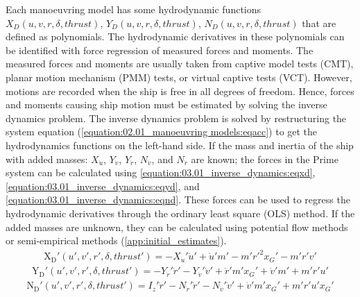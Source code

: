 Each manoeuvring model has some hydrodynamic functions \(X_D(u,v,r,\delta,thrust)\), \(Y_D(u,v,r,\delta,thrust)\), \(N_D(u,v,r,\delta,thrust)\) that are defined as polynomials. The hydrodynamic derivatives in these polynomials can be identified with force regression of measured forces and moments. The measured forces and moments are usually taken from captive model tests (CMT), planar motion mechanism (PMM) tests, or virtual captive tests (VCT). However, motions are recorded when the ship is free in all degrees of freedom. Hence, forces and moments causing ship motion must be estimated by solving the inverse dynamics problem.
The inverse dynamics problem is solved by restructuring the system equation (\autoref{equation:02.01_manoeuvring models:eqacc}) to get the hydrodynamics functions on the left-hand side. If the mass and inertia of the ship with added masses: \(X_{\dot{u}}\), \(Y_{\dot{v}}\), \(Y_{\dot{r}}\), \(N_{\dot{v}}\), and \(N_{\dot{r}}\) are known; the forces in the Prime system can be calculated using \autoref{equation:03.01_inverse_dynamics:eqxd}, \autoref{equation:03.01_inverse_dynamics:eqyd}, and \autoref{equation:03.01_inverse_dynamics:eqnd}.
These forces can be used to regress the hydrodynamic derivatives through the ordinary least square (OLS) method. If the added masses are unknown, they can be calculated using potential flow methods or semi-empirical methods (\autoref{app:initial_estimates}). 
\begin{equation}\label{equation:03.01_inverse_dynamics:eqxd}
\begin{split}\displaystyle \operatorname{X_{D}'}{\left(u',v',r',\delta,thrust' \right)} = - X_{\dot{u}}' \dot{u}' + \dot{u}' m' - m' r'^{2} x_{G}' - m' r' v'\end{split}
\end{equation}\begin{equation}\label{equation:03.01_inverse_dynamics:eqyd}
\begin{split}\displaystyle \operatorname{Y_{D}'}{\left(u',v',r',\delta,thrust' \right)} = - Y_{\dot{r}}' \dot{r}' - Y_{\dot{v}}' \dot{v}' + \dot{r}' m' x_{G}' + \dot{v}' m' + m' r' u'\end{split}
\end{equation}\begin{equation}\label{equation:03.01_inverse_dynamics:eqnd}
\begin{split}\displaystyle \operatorname{N_{D}'}{\left(u',v',r',\delta,thrust' \right)} = I_{z}' \dot{r}' - N_{\dot{r}}' \dot{r}' - N_{\dot{v}}' \dot{v}' + \dot{v}' m' x_{G}' + m' r' u' x_{G}'\end{split}
\end{equation}

